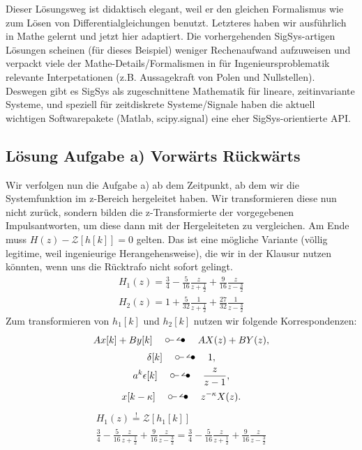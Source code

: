 \documentclass[11pt,a4paper,DIV=12]{scrartcl}
\begin{document}
%
%
Dieser Lösungsweg ist didaktisch elegant, weil er den gleichen Formalismus
wie zum Lösen von Differentialgleichungen benutzt.
%
Letzteres haben wir ausführlich in Mathe gelernt und jetzt hier adaptiert.
%
Die vorhergehenden SigSys-artigen Lösungen scheinen (für dieses Beispiel)
weniger Rechenaufwand aufzuweisen und verpackt viele der Mathe-Details/Formalismen
in für Ingenieursproblematik relevante Interpetationen
(z.B. Aussagekraft von Polen und Nullstellen).
%
Deswegen gibt es SigSys als zugeschnittene Mathematik für lineare, zeitinvariante
Systeme, und speziell für zeitdiskrete Systeme/Signale haben die aktuell wichtigen
Softwarepakete (Matlab, scipy.signal) eine eher SigSys-orientierte API.

\newpage
\subsection{Lösung Aufgabe a) Vorwärts Rückwärts}
\label{eq:H1equalH2}
%
Wir verfolgen nun die Aufgabe a) ab dem Zeitpunkt, ab dem wir die
Systemfunktion im z-Bereich hergeleitet haben.
%
Wir transformieren diese nun nicht zurück, sondern bilden die z-Transformierte
der vorgegebenen Impulsantworten, um diese dann mit der Hergeleiteten zu
vergleichen.
%
Am Ende muss $H(z)-\mathcal{Z}[h[k]]=0$ gelten.
%
Das ist eine mögliche Variante (völlig legitime, weil ingenieurige Herangehensweise),
die wir in der Klausur nutzen könnten, wenn uns die Rücktrafo nicht sofort gelingt.
%
\begin{gather}
	H_1(z)=\frac{3}{4}-\frac{5}{16}\frac{z}{z+\frac{1}{2}}+\frac{9}{16}\frac{z}{z-\frac{3}{2}}\\
	H_2(z)=1+\frac{5}{32}\frac{1}{z+\frac{1}{2}}+\frac{27}{32}\frac{1}{z-\frac{3}{2}}
\end{gather}
%
Zum transformieren von $h_1[k]$ und $h_2[k]$ nutzen wir folgende
Korrespondenzen:
%
\begin{gather}
	Ax[k]+By[k]\quad\ztransf\quad AX(z)+BY(z),\\
	\delta[k]\quad\ztransf\quad 1,\\
	a^k\epsilon[k]\quad\ztransf\quad \frac{z}{z-1},\\
	x[k-\kappa]\quad\ztransf\quad z^{-\kappa}X(z).
\end{gather}
%
\begin{gather}
	H_1(z)\overset{!}{=}\mathcal{Z}\left[h_1[k]\right]\\
	\frac{3}{4}-\frac{5}{16}\frac{z}{z+\frac{1}{2}}+\frac{9}{16}\frac{z}{z-\frac{3}{2}}
	=\frac{3}{4}-\frac{5}{16}\frac{z}{z+\frac{1}{2}}+\frac{9}{16}\frac{z}{z-\frac{3}{2}}\\
\end{gather}
\end{document}
